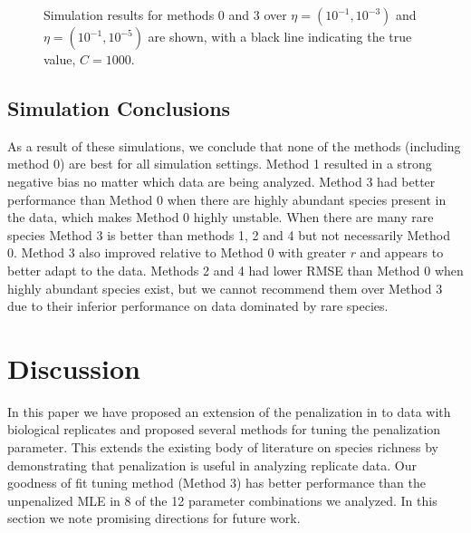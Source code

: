 \documentclass[oupdraft]{bio}
\begin{document}
\begin{figure}[t]
\caption{Simulation results for methods 0 and 3 over $\eta = (10^{-1}, 10^{-3})$ and $\eta = (10^{-1}, 10^{-5})$ are shown, with a black line indicating the true value, $C = 1000$.
\label{fig:tuning_sim_2}}  
\centering{}
\end{figure}

\subsection{Simulation Conclusions}

As a result of these simulations, we conclude that none of the methods (including method 0) are best for all simulation settings.  Method 1 resulted in a strong negative bias no matter which data are being analyzed.  Method 3 had better performance than Method 0 when there are highly abundant species present in the data, which makes Method 0 highly unstable.  When there are many rare species Method 3 is better than methods 1, 2 and 4 but not necessarily Method 0.  Method 3 also improved relative to Method 0 with greater $r$ and appears to better adapt to the data.  Methods 2 and 4 had lower RMSE than Method 0 when highly abundant species exist, but we cannot recommend them over Method 3 due to their inferior performance on data dominated by rare species.

\section{Discussion}
\label{sec:discussion}

In this paper we have proposed an extension of the penalization in \citet{wang_2005} to data with biological replicates and proposed several methods for tuning the penalization parameter.  This extends the existing body of literature on species richness by demonstrating that penalization is useful in analyzing replicate data.  Our goodness of fit tuning method (Method 3) has better performance than the unpenalized MLE in 8 of the 12 parameter combinations we analyzed.  In this section we note promising directions for future work.
\end{document}
